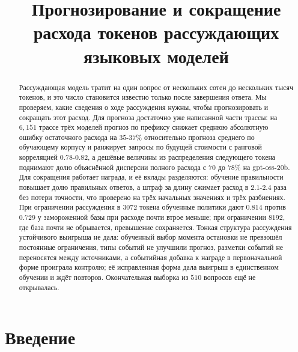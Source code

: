 \documentclass[11pt]{article}
\title{Прогнозирование и сокращение расхода токенов рассуждающих языковых моделей}
\author{}
\date{}
\begin{document}
\maketitle

\begin{abstract}
Рассуждающая модель тратит на один вопрос от нескольких сотен до нескольких тысяч токенов, и это число становится известно только после завершения ответа. Мы проверяем, какие сведения о ходе рассуждения нужны, чтобы прогнозировать и сокращать этот расход. Для прогноза достаточно уже написанной части трассы: на $6{,}151$ трассе трёх моделей прогноз по префиксу снижает среднюю абсолютную ошибку остаточного расхода на $35$-$37\%$ относительно прогноза среднего по обучающему корпусу и ранжирует запросы по будущей стоимости с ранговой корреляцией $0.78$-$0.82$, а дешёвые величины из распределения следующего токена поднимают долю объяснённой дисперсии полного расхода с $70$ до $78\%$ на gpt-oss-20b. Для сокращения работает награда, и её вклады разделяются: обучение правильности повышает долю правильных ответов, а штраф за длину сжимает расход в $2.1$-$2.4$ раза без потери точности, что проверено на трёх начальных значениях и трёх разбиениях. При ограничении рассуждения в $3072$ токена обученные политики дают $0.814$ против $0.729$ у замороженной базы при расходе почти втрое меньше; при ограничении $8192$, где база почти не обрывается, превышение сохраняется. Тонкая структура рассуждения устойчивого выигрыша не дала: обученный выбор момента остановки не превзошёл постоянные ограничения, типы событий не улучшили прогноз, разметки событий не переносятся между источниками, а событийная добавка к награде в первоначальной форме проиграла контролю; её исправленная форма дала выигрыш в единственном обучении и ждёт повторов. Окончательная выборка из $510$ вопросов ещё не открывалась.
\end{abstract}

\section{Введение}
\end{document}

